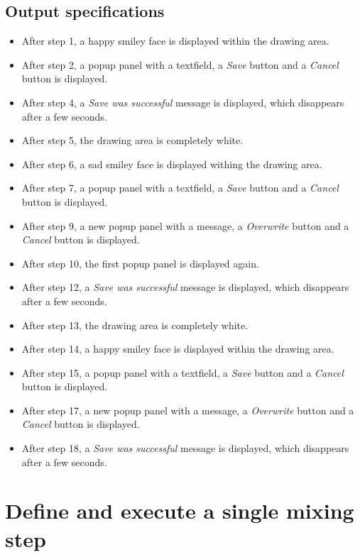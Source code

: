 \subsection*{Output specifications}
\begin{itemize}
\item After step 1, a happy smiley face is displayed within the drawing area.
\item After step 2, a popup panel with a textfield, a \emph{Save} button and a \emph{Cancel} button is displayed.
\item After step 4, a \emph{Save was successful} message is displayed, which disappears after a few seconds.
\item After step 5, the drawing area is completely white.
\item After step 6, a sad smiley face is displayed withing the drawing area.
\item After step 7, a popup panel with a textfield, a \emph{Save} button and a \emph{Cancel} button is displayed.
\item After step 9, a new popup panel with a message, a \emph{Overwrite} button and a \emph{Cancel} button is displayed.
\item After step 10, the first popup panel is displayed again.
\item After step 12, a \emph{Save was successful} message is displayed, which disappears after a few seconds.
\item After step 13, the drawing area is completely white.
\item After step 14, a happy smiley face is displayed within the drawing area.
\item After step 15, a popup panel with a textfield, a \emph{Save} button and a \emph{Cancel} button is displayed.
\item After step 17, a new popup panel with a message, a \emph{Overwrite} button and a \emph{Cancel} button is displayed.
\item After step 18, a \emph{Save was successful} message is displayed, which disappears after a few seconds.
\end{itemize}

\section{Define and execute a single mixing step}

